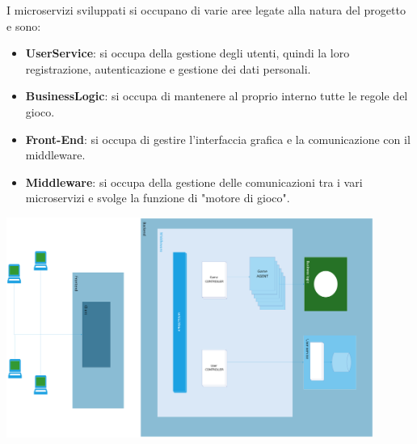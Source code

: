 I microservizi sviluppati si occupano di varie aree legate alla natura del progetto e sono:
\begin{itemize}
    \item \textbf{UserService}: si occupa della gestione degli utenti, quindi la loro registrazione, autenticazione e gestione dei dati personali.
    \item \textbf{BusinessLogic}: si occupa di mantenere al proprio interno tutte le regole del gioco.
    \item \textbf{Front-End}: si occupa di gestire l'interfaccia grafica e la comunicazione con il middleware.
    \item \textbf{Middleware}: si occupa della gestione delle comunicazioni tra i vari microservizi e svolge la funzione di "motore di gioco".
\end{itemize}

\includegraphics[width=12cm]{report/img/Architecture.png}\\[5.5cm]